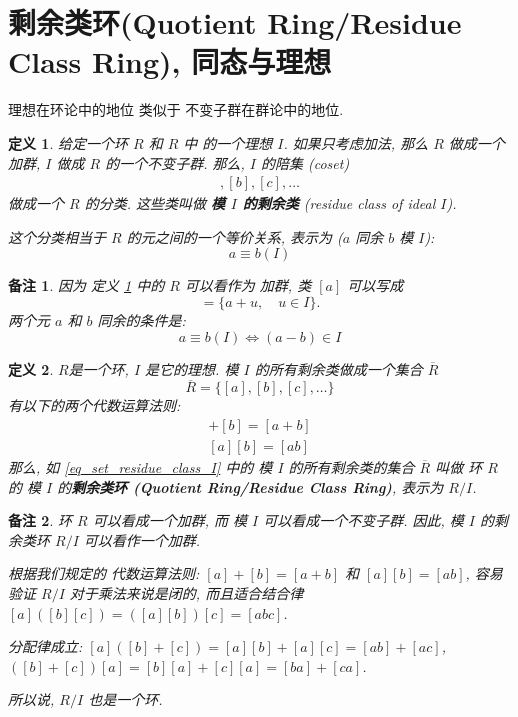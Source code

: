 \documentclass[utf8]{ctexbook}
\newtheorem{definition}{定义}[section]
\newtheorem{memo}{备注}[section]
\begin{document}
\section{剩余类环(Quotient Ring/Residue Class Ring), 同态与理想}

理想在环论中的地位 类似于 不变子群在群论中的地位.

\begin{definition}\label{def_residue_class_ideal}
给定一个环 $R$ 和 $R$ 中 的一个理想 $I$. 如果只考虑加法, 那么 $R$ 做成一个加群, $I$ 做成 $R$ 的一个不变子群. 那么, $I$ 的陪集 (coset)
\begin{align*}
[a], [b], [c], \ldots
\end{align*}
做成一个 $R$ 的分类. 这些类叫做 \textbf{模 $I$ 的剩余类} (residue class of ideal $I$).

这个分类相当于 $R$ 的元之间的一个等价关系, 表示为 ($a$ 同余 $b$ 模 $I$):
\begin{equation}
a \equiv b(I) \nonumber
\end{equation}
\end{definition}

\begin{memo}
因为 定义 \ref{def_residue_class_ideal} 中的 $R$ 可以看作为 加群, 类 $[a]$ 可以写成
\begin{equation}
[a] = \{ a + u , \quad u \in I \} . \nonumber
\end{equation}
两个元 $a$ 和 $b$ 同余的条件是:
\begin{equation}
a \equiv b (I) \iff (a-b) \in I \nonumber
\end{equation}

\end{memo}

\begin{definition}\label{def_quotient_ring_set}
$R$是一个环, $I$ 是它的理想. 模 $I$ 的所有剩余类做成一个集合 $\overline{R}$
\begin{equation}
\overline{R} = \{ [a], [b], [c], \ldots \} \label{eq_set_residue_class_I}
\end{equation}
有以下的两个代数运算法则:
\begin{align*}
[a] +[b] = [a+b] \\
[a][b] = [ab]
\end{align*}
那么, 如 \ref{eq_set_residue_class_I} 中的 模 $I$ 的所有剩余类的集合 $\overline{R}$ 叫做 环 $R$ 的 模 $I$ 的\textbf{剩余类环 (Quotient Ring/Residue Class Ring)}, 表示为 $R/I$.
\end{definition}

\begin{memo}
环 $R$ 可以看成一个加群, 而 模 $I$ 可以看成一个不变子群. 因此, 模 $I$ 的剩余类环 $R/I$ 可以看作一个加群. 

根据我们规定的 代数运算法则: $[a] +[b] = [a+b]$ 和 $[a][b] = [ab]$, 容易验证 $R/I$ 对于乘法来说是闭的, 而且适合结合律 $ [a]([b][c]) = ([a][b])[c] = [abc] $.

分配律成立: $ [a]([b]+[c]) = [a][b] + [a][c] = [ab] + [ac]$, $([b] + [c]) [a] = [b][a] + [c][a] = [ba] + [ca]$.

所以说, $R/I$ 也是一个环.
\end{memo}
\end{document}
